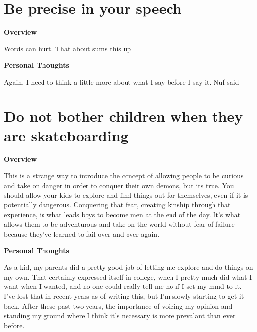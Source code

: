 \documentclass{article}
\begin{document}
\section{Be precise in your speech}
        \begin{multicols}{2}
        \begin{center}
            \textbf{Overview}
        \end{center}
        
        Words can hurt. That about sums this up

        \begin{center}
            \textbf{Personal Thoughts}
        \end{center}
        
        Again. I need to think a little more about what I say before I say it. Nuf said
    \end{multicols}
    
\section{Do not bother children when they are skateboarding}
        \begin{multicols}{2}
        \begin{center}
            \textbf{Overview}
        \end{center}
        
        This is a strange way to introduce the concept of allowing people to be curious and take on danger in order to conquer their own demons, but its true. You should allow your kids to explore and find things out for themselves, even if it is potentially dangerous. Conquering that fear, creating kinship through that experience, is what leads boys to become men at the end of the day. It's what allows them to be adventurous and take on the world without fear of failure because they've learned to fail over and over again.

        \begin{center}
            \textbf{Personal Thoughts}
        \end{center}
        
        As a kid, my parents did a pretty good job of letting me explore and do things on my own. That certainly expressed itself in college, when I pretty much did what I want when I wanted, and no one could really tell me no if I set my mind to it. I've lost that in recent years as of writing this, but I'm slowly starting to get it back. After these past two years, the importance of voicing my opinion and standing my ground where I think it's necessary is more prevalant than ever before.
    \end{multicols}
    
\end{document}

